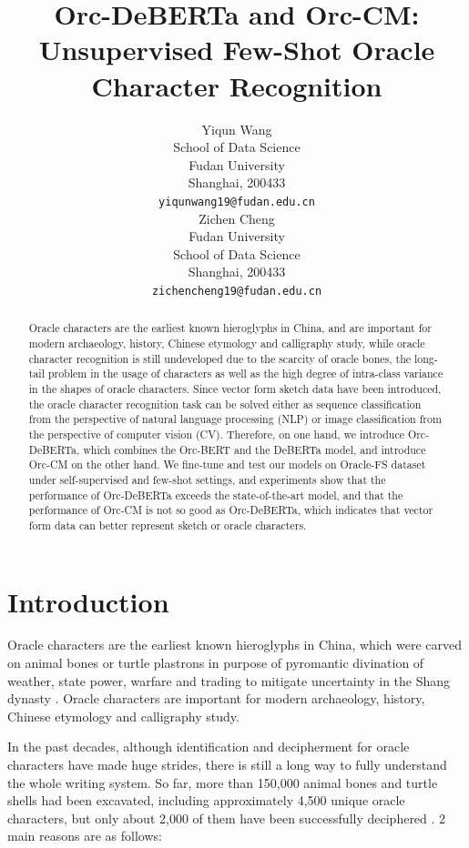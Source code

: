 \documentclass{article}
\title{Orc-DeBERTa and Orc-CM: Unsupervised Few-Shot Oracle Character Recognition}
\author{
  Yiqun Wang \\
  School of Data Science \\
  Fudan University \\
  Shanghai, 200433 \\
  \texttt{yiqunwang19@fudan.edu.cn} \\
  \And
  Zichen Cheng \\
  Fudan University \\
  School of Data Science \\
  Shanghai, 200433 \\
  \texttt{zichencheng19@fudan.edu.cn} \\
}
\begin{document}
\maketitle

\begin{abstract}
Oracle characters are the earliest known hieroglyphs in China, and are important for modern archaeology, history, Chinese etymology and calligraphy study, while oracle character recognition is still undeveloped due to the scarcity of oracle bones, the long-tail problem in the usage of characters as well as the high degree of intra-class variance in the shapes of oracle characters.
Since vector form sketch data have been introduced, the oracle character recognition task can be solved either as sequence classification from the perspective of natural language processing (NLP) or image classification from the perspective of computer vision (CV). Therefore, on one hand, we introduce Orc-DeBERTa, which combines the Orc-BERT and the DeBERTa model, and introduce Orc-CM on the other hand.
We fine-tune and test our models on Oracle-FS dataset under self-supervised and few-shot settings, and experiments show that the performance of Orc-DeBERTa exceeds the state-of-the-art model, and that the performance of Orc-CM is not so good as Orc-DeBERTa, which indicates that vector form data can better represent sketch or oracle characters.
\end{abstract}

\section{Introduction}

Oracle characters are the earliest known hieroglyphs in China, which were carved on animal bones or turtle plastrons in purpose of pyromantic divination of weather, state power, warfare and trading to mitigate uncertainty in the Shang dynasty \citep{Oracle}. Oracle characters are important for modern archaeology, history, Chinese etymology and calligraphy study. \citep{Hierachical, Neighbor}

In the past decades, although identification and decipherment for oracle characters have made huge strides, there is still a long way to fully understand the whole writing system. 
So far, more than 150,000 animal bones and turtle shells had been excavated, including approximately 4,500 unique oracle characters, but only about 2,000 of them have been successfully deciphered \citep{OBC306}.
2 main reasons are as follows:
\end{document}
